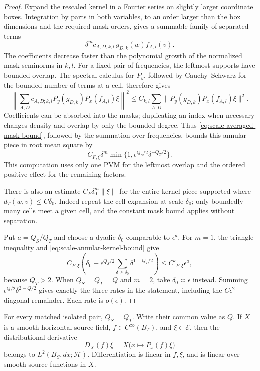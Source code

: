 \begin{proof}
Expand the rescaled kernel in a Fourier series on slightly larger
coordinate boxes.  Integration by parts in both variables, to an
order larger than the box dimensions and the required mask orders,
gives a summable family of separated terms
\[
 \delta^m c_{A,D;k,l}\,
       g_{D,k}(w)f_{A,l}(v).
\]
The coefficients decrease faster than the polynomial growth of the
normalized mask seminorms in $k,l$.  For a fixed pair of frequencies,
the leftmost supports have bounded overlap.  The spectral calculus
for $P_y$, followed by Cauchy--Schwarz for the bounded number of terms
at a cell, therefore gives
\[
 \left\|\sum_{A,D}c_{A,D;k,l}
       P_y(g_{D,k})P_x(f_{A,l})\xi\right\|^2
 \le C_{k,l}\sum_{A,D}
       \|P_y(g_{D,k})P_x(f_{A,l})\xi\|^2.
\]
Coefficients can be absorbed into the masks; duplicating an index
when necessary changes density and overlap by only the bounded
degree.  Thus \eqref{eq:scale-averaged-mask-bound}, followed by the
summation over frequencies, bounds this annular piece in root mean
square by
\begin{equation}\label{eq:scale-annular-kernel-bound}
 C_{F,\xi}\delta^m
       \min\{1,\epsilon^{Q_S/2}\delta^{-Q_T/2}\}.
\end{equation}
This computation uses only one PVM for the leftmost overlap and the
ordered positive effect for the remaining factors.

There is also an estimate $C_F\delta_0^m\|\xi\|$ for the entire kernel
piece supported where $d_T(w,v)\le C\delta_0$.  Indeed repeat the cell
expansion at scale $\delta_0$; only boundedly many cells meet a given
cell, and the constant mask bound applies without separation.

Put $a=Q_S/Q_T$ and choose a dyadic $\delta_0$ comparable to
$\epsilon^a$.  For $m=1$, the triangle inequality and
\eqref{eq:scale-annular-kernel-bound} give
\[
 C_{F,\xi}\left(\delta_0+
       \epsilon^{Q_S/2}\sum_{\delta\ge\delta_0}
                         \delta^{1-Q_T/2}\right)
 \le C'_{F,\xi}\epsilon^a,
\]
because $Q_T>2$.  When $Q_S=Q_T=Q$ and $m=2$, take
$\delta_0\asymp\epsilon$ instead.  Summing
$\epsilon^{Q/2}\delta^{2-Q/2}$ gives exactly the three rates in the
statement, including the $C\epsilon^2$ diagonal remainder.  Each rate
is $o(\epsilon)$.
\end{proof}

\begin{lemma}\label{lem:scale-equal-dimension}
For every matched isolated pair, $Q_S=Q_T$.  Write their common value
as $Q$.  If $X$ is a smooth horizontal source field,
$f\in C^\infty(B_T)$, and $\xi\in\mathscr E$, then the distributional
derivative
\[
 D_X(f)\xi=X\bigl(x\mapsto P_x(f)\xi\bigr)
\]
belongs to $L^2(B_S,dx;\mathcal H)$.  Differentiation is linear in
$f,\xi$, and is linear over smooth source functions in $X$.
\end{lemma}

